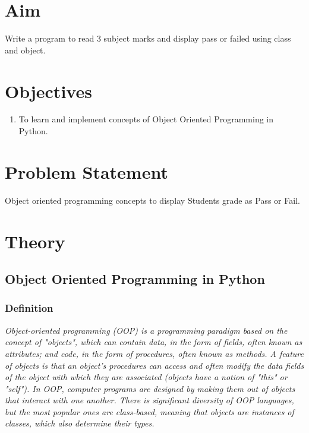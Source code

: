 \documentclass[11pt]{article}
\begin{document}
\tableofcontents
\thispagestyle{empty}
\clearpage

\setcounter{page}{1}

\section{Aim}
Write a program to read 3 subject marks and display pass or failed using class and object.

\section{Objectives}
\begin{enumerate}
	\item To learn and implement concepts of Object Oriented Programming in Python.
\end{enumerate}

\section{Problem Statement}
Object oriented programming concepts to display Students grade as Pass or Fail.

\section{Theory}

\subsection{Object Oriented Programming in Python}

\subsubsection{Definition}

\textit{Object-oriented programming (OOP) is a programming paradigm based on the concept of "objects", which can contain data, in the form of fields, often known as attributes; and code, in the form of procedures, often known as methods. A feature of objects is that an object's procedures can access and often modify the data fields of the object with which they are associated (objects have a notion of "this" or "self"). In OOP, computer programs are designed by making them out of objects that interact with one another. There is significant diversity of OOP languages, but the most popular ones are class-based, meaning that objects are instances of classes, which also determine their types.}
\end{document}
